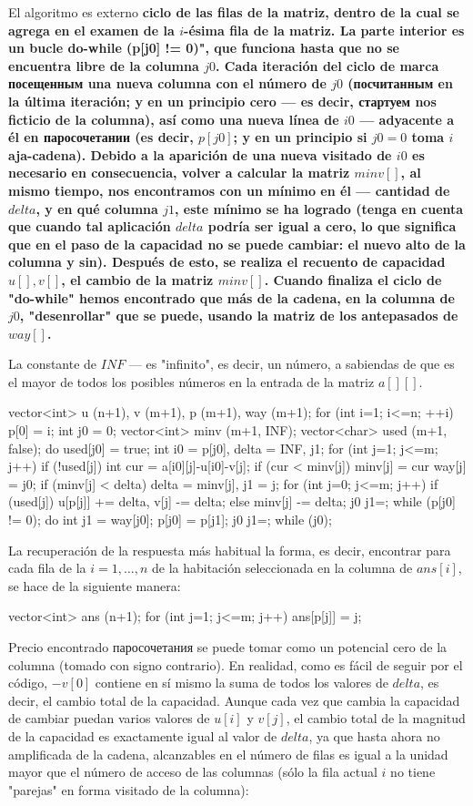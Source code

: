 El algoritmo es externo \bf{ciclo de las filas de la matriz}, dentro de la cual se agrega en el examen de la $i$-ésima fila de la matriz. La parte interior es un bucle do-while (p[j0] != 0)", que funciona hasta que no se encuentra libre de la columna $j0$. Cada iteración del ciclo de marca посещенным una nueva columna con el número de $j0$ (посчитанным en la última iteración; y en un principio cero --- es decir, стартуем nos ficticio de la columna), así como una nueva línea de $i0$ --- adyacente a él en паросочетании (es decir, $p[j0]$; y en un principio si $j0=0$ toma $i$aja-cadena). Debido a la aparición de una nueva visitado de $i0$ es necesario en consecuencia, volver a calcular la matriz $minv[]$, al mismo tiempo, nos encontramos con un mínimo en él --- cantidad de $delta$, y en qué columna $j1$, este mínimo se ha logrado (tenga en cuenta que cuando tal aplicación $delta$ podría ser igual a cero, lo que significa que en el paso de la capacidad no se puede cambiar: el nuevo alto de la columna y sin). Después de esto, se realiza el recuento de capacidad $u[], v[]$, el cambio de la matriz $minv[]$. Cuando finaliza el ciclo de "do-while" hemos encontrado que más de la cadena, en la columna de $j0$, "desenrollar" que se puede, usando la matriz de los antepasados de $way[]$.

La constante de $INF$ --- es "infinito", es decir, un número, a sabiendas de que es el mayor de todos los posibles números en la entrada de la matriz $a[][]$.

\code
vector<int> u (n+1), v (m+1), p (m+1), way (m+1);
for (int i=1; i<=n; ++i) {
p[0] = i;
int j0 = 0;
vector<int> minv (m+1, INF);
vector<char> used (m+1, false);
do {
used[j0] = true;
int i0 = p[j0], delta = INF, j1;
for (int j=1; j<=m; j++)
if (!used[j]) {
int cur = a[i0][j]-u[i0]-v[j];
if (cur < minv[j])
minv[j] = cur way[j] = j0;
if (minv[j] < delta)
delta = minv[j], j1 = j;
}
for (int j=0; j<=m; j++)
if (used[j])
u[p[j]] += delta, v[j] -= delta;
else
minv[j] -= delta;
j0 j1=;
} while (p[j0] != 0);
do {
int j1 = way[j0];
p[j0] = p[j1];
j0 j1=;
} while (j0);
}
\endcode

La recuperación de la respuesta más habitual la forma, es decir, encontrar para cada fila de la $i = 1, \ldots, n$ de la habitación seleccionada en la columna de $ans[i]$, se hace de la siguiente manera:

\code
vector<int> ans (n+1);
for (int j=1; j<=m; j++)
ans[p[j]] = j;
\endcode

Precio encontrado паросочетания se puede tomar como un potencial cero de la columna (tomado con signo contrario). En realidad, como es fácil de seguir por el código, $-v[0]$ contiene en sí mismo la suma de todos los valores de $delta$, es decir, el cambio total de la capacidad. Aunque cada vez que cambia la capacidad de cambiar puedan varios valores de $u[i]$ y $v[j]$, el cambio total de la magnitud de la capacidad es exactamente igual al valor de $delta$, ya que hasta ahora no amplificada de la cadena, alcanzables en el número de filas es igual a la unidad mayor que el número de acceso de las columnas (sólo la fila actual $i$ no tiene "parejas" en forma visitado de la columna):

